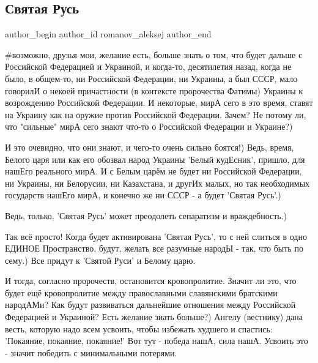  
 
 
 
 
 
\subsection{Святая Русь}
\label{sec:05_02_2022.fb.romanov_aleksej.1.svjataja_rusj}
 
\ifcmt
 author_begin
   author_id romanov_aleksej
 author_end
\fi

\#возможно, друзья мои, желание есть, больше знать о том, что будет дальше с
Российской Федерацией и Украиной, и когда-то, десятилетия назад, когда не было,
в общем-то, ни Российской Федерации, ни Украины, а был СССР, мало говорилИ о
некоей причастности (в контексте пророчества Фатимы) Украины к возрождению
Российской Федерации. И некоторые, мирА сего в это время, ставят на Украину как
на оружие против Российской Федерации. Зачем? Не потому ли, что "сильные" мирА
сего знают что-то о Российской Федерации и Украине?)


И это очевидно, что они знают, и чего-то очень сильно боятся!) Ведь, время,
Белого царя или как его обозвал народ Украины 'Белый кудЕсник', пришло, для
нашЕго реального мирА. И с Белым царём не будет ни Российской Федерации, ни
Украины, ни Белорусии, ни Казахстана, и другИх малых, но так необходимых
государств нашЕго мирА, и конечно же ни СССР - а будет 'Святая Русь'.) 

Ведь, только, 'Святая Русь' может преодолеть сепаратизм и враждебность.) 

Так всё просто! Когда будет активирована 'Святая Русь', то с ней слиться в одно
ЕДИНОЕ Пространство, будут, желать все разумные народЫ - так, что быть по
сему.) Все придут к 'Святой Руси' и Белому царю.

И тогда, согласно пророчеств, остановится кровопролитие. Значит ли это, что
будет ещё кровопролитие между православными славянскими братскими народАМи? Как
будут развиваться дальнейшие отношения между Российской Федерацией и Украиной?
Есть желание знать больше?) Ангелу (вестнику) дана весть, которую надо всем
усвоить, чтобы избежать худшего и спастись: 'Покаяние, покаяние, покаяние!' Вот
тут - победа нашА, сила нашА. Усвоить это - значит победить с минимальными
потерями.


